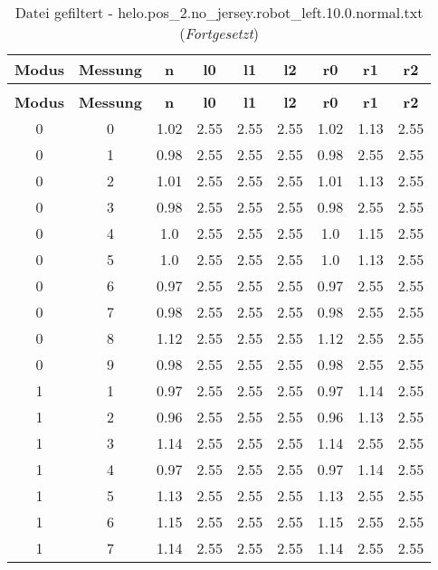 \begin{longtable}{|c|c||c||c|c|c||c|c|c|}
	\caption{Datei gefiltert - helo.pos\_2.no\_jersey.robot\_left.10.0.normal.txt} \label{tab:helo.pos-2.no-jersey.robot-left.10.0.normal.txt} \\ \hline
	\textbf{Modus} & \textbf{Messung} & \textbf{n} & \textbf{l0} & \textbf{l1} & \textbf{l2} & \textbf{r0} & \textbf{r1} & \textbf{r2}\\ \hline
	\endfirsthead
	\caption[]{Datei gefiltert - helo.pos\_2.no\_jersey.robot\_left.10.0.normal.txt (\emph{Fortgesetzt})} \\ \hline
	\textbf{Modus} & \textbf{Messung} & \textbf{n} & \textbf{l0} & \textbf{l1} & \textbf{l2} & \textbf{r0} & \textbf{r1} & \textbf{r2}\\ \hline
	\endhead
	0 & 0 & 1.02 & 2.55 & 2.55 & 2.55 & 1.02 & 1.13 & 2.55 \\ \hline
	0 & 1 & 0.98 & 2.55 & 2.55 & 2.55 & 0.98 & 2.55 & 2.55 \\ \hline
	0 & 2 & 1.01 & 2.55 & 2.55 & 2.55 & 1.01 & 1.13 & 2.55 \\ \hline
	0 & 3 & 0.98 & 2.55 & 2.55 & 2.55 & 0.98 & 2.55 & 2.55 \\ \hline
	0 & 4 & 1.0 & 2.55 & 2.55 & 2.55 & 1.0 & 1.15 & 2.55 \\ \hline
	0 & 5 & 1.0 & 2.55 & 2.55 & 2.55 & 1.0 & 1.13 & 2.55 \\ \hline
	0 & 6 & 0.97 & 2.55 & 2.55 & 2.55 & 0.97 & 2.55 & 2.55 \\ \hline
	0 & 7 & 0.98 & 2.55 & 2.55 & 2.55 & 0.98 & 2.55 & 2.55 \\ \hline
	0 & 8 & 1.12 & 2.55 & 2.55 & 2.55 & 1.12 & 2.55 & 2.55 \\ \hline
	0 & 9 & 0.98 & 2.55 & 2.55 & 2.55 & 0.98 & 2.55 & 2.55 \\ \hline
	1 & 1 & 0.97 & 2.55 & 2.55 & 2.55 & 0.97 & 1.14 & 2.55 \\ \hline
	1 & 2 & 0.96 & 2.55 & 2.55 & 2.55 & 0.96 & 1.13 & 2.55 \\ \hline
	1 & 3 & 1.14 & 2.55 & 2.55 & 2.55 & 1.14 & 2.55 & 2.55 \\ \hline
	1 & 4 & 0.97 & 2.55 & 2.55 & 2.55 & 0.97 & 1.14 & 2.55 \\ \hline
	1 & 5 & 1.13 & 2.55 & 2.55 & 2.55 & 1.13 & 2.55 & 2.55 \\ \hline
	1 & 6 & 1.15 & 2.55 & 2.55 & 2.55 & 1.15 & 2.55 & 2.55 \\ \hline
	1 & 7 & 1.14 & 2.55 & 2.55 & 2.55 & 1.14 & 2.55 & 2.55 \\ \hline

\end{longtable}
